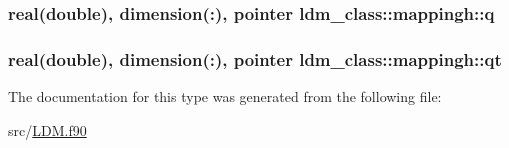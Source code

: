 \hypertarget{structldm__class_1_1mappingh_a96362e0e8ef0f331697c4f4eb6f469f3}{
\subsubsection[{q}]{\setlength{\rightskip}{0pt plus 5cm}real(double), dimension(\+:), pointer ldm\+\_\+class\+::mappingh\+::q\hspace{0.3cm}{\ttfamily [private]}}}\label{structldm__class_1_1mappingh_a96362e0e8ef0f331697c4f4eb6f469f3}
\hypertarget{structldm__class_1_1mappingh_aec5f3cec49bf4ddcdb7121004a387517}{
\subsubsection[{qt}]{\setlength{\rightskip}{0pt plus 5cm}real(double), dimension(\+:), pointer ldm\+\_\+class\+::mappingh\+::qt\hspace{0.3cm}{\ttfamily [private]}}}\label{structldm__class_1_1mappingh_aec5f3cec49bf4ddcdb7121004a387517}


The documentation for this type was generated from the following file\+:\begin{DoxyCompactItemize}
\item 
src/\hyperlink{_l_d_m_8f90}{L\+D\+M.\+f90}\end{DoxyCompactItemize}

